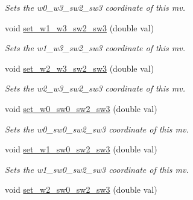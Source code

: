 \begin{DoxyCompactItemize}
\begin{DoxyCompactList}\small\item\em Sets the w0\-\_\-w3\-\_\-sw2\-\_\-sw3 coordinate of this mv. \end{DoxyCompactList}\item 
\hypertarget{classe3ga_1_1mv_a1159f2f153e7908fae8ad0acdbdfd4b7}{void \hyperlink{classe3ga_1_1mv_a1159f2f153e7908fae8ad0acdbdfd4b7}{set\-\_\-w1\-\_\-w3\-\_\-sw2\-\_\-sw3} (double val)}\label{classe3ga_1_1mv_a1159f2f153e7908fae8ad0acdbdfd4b7}

\begin{DoxyCompactList}\small\item\em Sets the w1\-\_\-w3\-\_\-sw2\-\_\-sw3 coordinate of this mv. \end{DoxyCompactList}\item 
\hypertarget{classe3ga_1_1mv_a2b1b22bae925705c8daada723e0f7770}{void \hyperlink{classe3ga_1_1mv_a2b1b22bae925705c8daada723e0f7770}{set\-\_\-w2\-\_\-w3\-\_\-sw2\-\_\-sw3} (double val)}\label{classe3ga_1_1mv_a2b1b22bae925705c8daada723e0f7770}

\begin{DoxyCompactList}\small\item\em Sets the w2\-\_\-w3\-\_\-sw2\-\_\-sw3 coordinate of this mv. \end{DoxyCompactList}\item 
\hypertarget{classe3ga_1_1mv_a533f978ea9ed16e078e0f82f642c10c4}{void \hyperlink{classe3ga_1_1mv_a533f978ea9ed16e078e0f82f642c10c4}{set\-\_\-w0\-\_\-sw0\-\_\-sw2\-\_\-sw3} (double val)}\label{classe3ga_1_1mv_a533f978ea9ed16e078e0f82f642c10c4}

\begin{DoxyCompactList}\small\item\em Sets the w0\-\_\-sw0\-\_\-sw2\-\_\-sw3 coordinate of this mv. \end{DoxyCompactList}\item 
\hypertarget{classe3ga_1_1mv_a52597c76e27bd131a6479a7668c82cf2}{void \hyperlink{classe3ga_1_1mv_a52597c76e27bd131a6479a7668c82cf2}{set\-\_\-w1\-\_\-sw0\-\_\-sw2\-\_\-sw3} (double val)}\label{classe3ga_1_1mv_a52597c76e27bd131a6479a7668c82cf2}

\begin{DoxyCompactList}\small\item\em Sets the w1\-\_\-sw0\-\_\-sw2\-\_\-sw3 coordinate of this mv. \end{DoxyCompactList}\item 
\hypertarget{classe3ga_1_1mv_a96dc4014959ec850036ceff2b7dea2fc}{void \hyperlink{classe3ga_1_1mv_a96dc4014959ec850036ceff2b7dea2fc}{set\-\_\-w2\-\_\-sw0\-\_\-sw2\-\_\-sw3} (double val)}\label{classe3ga_1_1mv_a96dc4014959ec850036ceff2b7dea2fc}


\end{DoxyCompactItemize}
